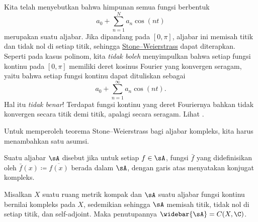 \begin{example}
Kita telah menyebutkan bahwa himpunan semua fungsi berbentuk
\begin{equation*}
a_0 +
\sum_{n=1}^N a_n \cos(nt)
\end{equation*}
merupakan suatu aljabar.
Jika dipandang pada $[0,\pi]$,
aljabar ini memisah titik dan tidak nol di setiap titik, sehingga
\hyperref[thm:SWreal]{Stone--Weierstrass} dapat diterapkan.
Seperti pada kasus polinom, kita \emph{tidak boleh} menyimpulkan bahwa setiap fungsi
kontinu pada $[0,\pi]$ memiliki deret kosinus Fourier yang konvergen seragam,
yaitu bahwa setiap fungsi kontinu dapat dituliskan sebagai
\begin{equation*}
a_0 +
\sum_{n=1}^\infty a_n \cos(nt) .
\end{equation*}
Hal itu \emph{tidak benar}!
Terdapat fungsi kontinu yang deret Fouriernya bahkan tidak konvergen secara
titik demi titik, apalagi secara seragam. Lihat .
\end{example}

Untuk memperoleh teorema Stone--Weierstrass bagi aljabar kompleks, kita harus
menambahkan satu asumsi.

\begin{defn}
Suatu aljabar $\sA$ disebut \emph{} jika untuk setiap $f \in \sA$,
fungsi $\bar{f}$ yang didefinisikan oleh $\bar{f}(x) \coloneqq \overline{f(x)}$
berada dalam $\sA$, dengan garis atas menyatakan konjugat kompleks.
\end{defn}

\begin{thm}
\label{thm:SWcomplex}%
%
Misalkan $X$ suatu ruang metrik kompak dan $\sA$ suatu aljabar fungsi kontinu
bernilai kompleks pada $X$, sedemikian sehingga $\sA$ memisah titik, tidak nol
di setiap titik, dan self-adjoint. Maka penutupannya
$\widebar{\sA} = C(X,\C)$.
\end{thm}

